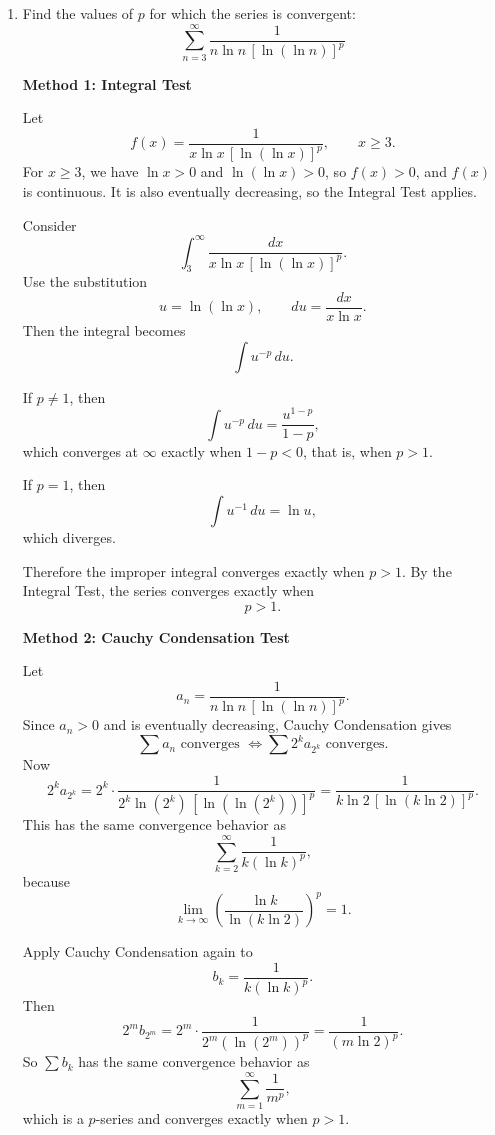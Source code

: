 \documentclass[a4paper,12pt,twocolumn]{article}
\newenvironment{solutionbox}{\begin{framed}}{\end{framed}}
\begin{document}
\begin{enumerate}[label=\textbf{\arabic*.}, leftmargin=2em, itemsep=1.2em]
\begin{solutionbox}
\medskip
\textbf{Answer:}
\[
\boxed{\sum_{n=1}^{\infty}\frac{\tan^{-1} n}{1+n^2}\text{ converges}.}
\]
\end{solutionbox}

\setcounter{enumi}{31}
\item Find the values of \(p\) for which the series is convergent:
\[
\sum_{n=3}^{\infty} \frac{1}{n \ln n \,[\ln(\ln n)]^p}
\]

\begin{solutionbox}
\textbf{Method 1: Integral Test}

Let
\[
f(x)=\frac{1}{x\ln x\,[\ln(\ln x)]^p}, \qquad x\ge 3.
\]
For \(x\ge 3\), we have \(\ln x>0\) and \(\ln(\ln x)>0\), so \(f(x)>0\), and \(f(x)\) is continuous. It is also eventually decreasing, so the Integral Test applies.

Consider
\[
\int_3^\infty \frac{dx}{x\ln x\,[\ln(\ln x)]^p}.
\]
Use the substitution
\[
u=\ln(\ln x), \qquad du=\frac{dx}{x\ln x}.
\]
Then the integral becomes
\[
\int u^{-p}\,du.
\]

If \(p\neq 1\), then
\[
\int u^{-p}\,du=\frac{u^{1-p}}{1-p},
\]
which converges at \(\infty\) exactly when \(1-p<0\), that is, when \(p>1\).

If \(p=1\), then
\[
\int u^{-1}\,du=\ln u,
\]
which diverges.

Therefore the improper integral converges exactly when \(p>1\). By the Integral Test, the series converges exactly when
\[
p>1.
\]
\end{solutionbox}

\begin{solutionbox}
\textbf{Method 2: Cauchy Condensation Test}

Let
\[
a_n=\frac{1}{n\ln n\,[\ln(\ln n)]^p}.
\]
Since \(a_n>0\) and is eventually decreasing, Cauchy Condensation gives
\[
\sum a_n \text{ converges }
\Longleftrightarrow
\sum 2^k a_{2^k} \text{ converges.}
\]
Now
\[
2^k a_{2^k}
=
2^k\cdot \frac{1}{2^k\ln(2^k)\,[\ln(\ln(2^k))]^p}
=
\frac{1}{k\ln 2\,[\ln(k\ln 2)]^p}.
\]
This has the same convergence behavior as
\[
\sum_{k=2}^{\infty}\frac{1}{k(\ln k)^p},
\]
because
\[
\lim_{k\to\infty}\left(\frac{\ln k}{\ln(k\ln 2)}\right)^p=1.
\]

Apply Cauchy Condensation again to
\[
b_k=\frac{1}{k(\ln k)^p}.
\]
Then
\[
2^m b_{2^m}
=
2^m\cdot \frac{1}{2^m(\ln(2^m))^p}
=
\frac{1}{(m\ln 2)^p}.
\]
So \(\sum b_k\) has the same convergence behavior as
\[
\sum_{m=1}^{\infty}\frac{1}{m^p},
\]
which is a \(p\)-series and converges exactly when \(p>1\).


\end{solutionbox}
\end{enumerate}
\end{document}
